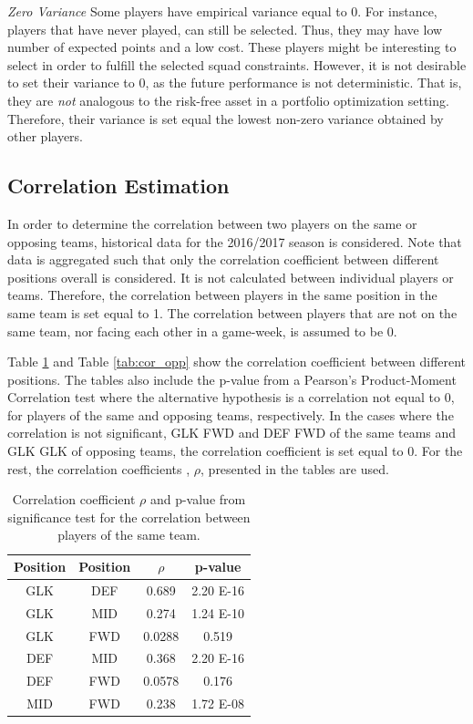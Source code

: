 \textit{Zero Variance}
\newline
Some players have empirical variance equal to 0. For instance, players that have never played, can still be selected. Thus, they may have low number of expected points and a low cost. These players might be interesting to select in order to fulfill the selected squad constraints. However, it is not desirable to set their variance to 0, as the future performance is not deterministic. That is, they are \textit{not} analogous to the risk-free asset in a portfolio optimization setting. Therefore, their variance is set equal the lowest non-zero variance obtained by other players.

\subsection{Correlation Estimation}

In order to determine the correlation between two players on the same or opposing teams, historical data for the 2016/2017 season is considered. Note that data is aggregated such that only the correlation coefficient between different positions overall is considered. It is not calculated between individual players or teams. Therefore, the correlation between players in the same position in the same team is set equal to 1. The correlation between players that are not on the same team, nor facing each other in a game-week, is assumed to be 0.

\newpar

Table \ref{tab:cor_team} and Table \ref{tab:cor_opp} show the correlation coefficient between different positions. The tables also include the p-value from a Pearson's Product-Moment Correlation test where the alternative hypothesis is a correlation not equal to 0, for players of the same and opposing teams, respectively. In the cases where the correlation is not significant, GLK FWD and DEF FWD of the same teams and GLK GLK of opposing teams, the correlation coefficient is set equal to 0. For the rest, the correlation coefficients , $\rho$, presented in the tables are used.

\begin{table}[H]
\centering
\begin{tabular}{|c|c|c|c|}
\hline
Position & Position & $\rho$    & p-value  \\
\hline
GLK      & DEF      & 0.689  & 2.20 E-16 \\
GLK      & MID      & 0.274  & 1.24 E-10 \\
GLK      & FWD      & 0.0288 & 0.519    \\
DEF      & MID      & 0.368  & 2.20 E-16 \\
DEF      & FWD      & 0.0578 & 0.176    \\
MID      & FWD      & 0.238  & 1.72 E-08 \\
\hline
\end{tabular}
\caption{Correlation coefficient $\rho$ and p-value from significance test for the correlation between players of the same team.}
\label{tab:cor_team}
\end{table}

